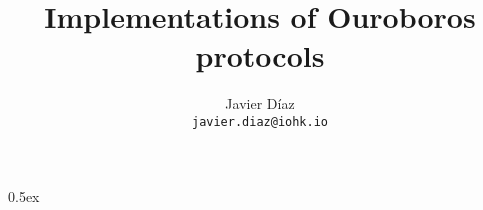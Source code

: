 \documentclass[a4paper,11pt]{article}
\begin{document}
\title{Implementations of Ouroboros protocols}
\author{Javier D\'iaz\\\small\texttt{javier.diaz@iohk.io}}

\maketitle

\tableofcontents

\parindent 0pt\parskip 0.5ex


\end{document}
